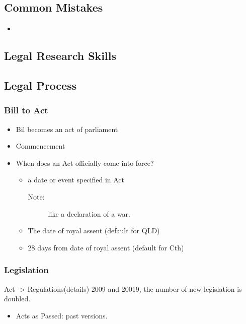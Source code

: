 \subsection*{Common Mistakes}
\begin{itemize}
    \item 
\end{itemize}

\subsection*{Legal Research Skills}




\subsection*{Legal Process}

\subsubsection*{Bill to Act}
\begin{itemize}
    \item Bil becomes an act of parliament
    \item Commencement
    \item When does an Act officially come into force?
        \begin{itemize}
            \item a date or event specified in Act
                \begin{description}
                    \item[Note:] like a declaration of a war.  
                \end{description}
            \item The date of royal assent (default for QLD)
            \item 28 days from date of royal assent (default for Cth)
        \end{itemize}
\end{itemize}

\subsubsection*{Legislation}
Act -> Regulations(details)
2009 and 20019, the number of new legislation is doubled. 

\begin{itemize}
    \item Acts as Passed: past versions.
\end{itemize}

